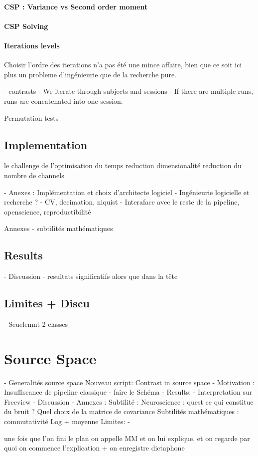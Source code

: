 \paragraph{CSP : Variance vs Second order moment}

\paragraph{CSP Solving}


\paragraph{Iterations levels}

Choisir l'ordre des iterations n'a pas été une mince affaire, bien que ce soit ici plus un probleme d'ingénieurie que de la recherche pure.

- contrasts
    - We iterate through subjects and sessions
        - If there are multiple runs, runs are concatenated into one session.

Permutation tests


\subsection{Implementation}

le challenge de l'optimisation du temps
reduction dimensionalité
reduction du nombre de channels

- Anexes : Implémentation et choix d'architecte logiciel
- Ingénieurie logicielle et recherche ?
- CV, decimation, niquist
- Interaface avec le reste de la pipeline, openscience, reproductibilité

Annexes - subtilités mathématiques

\subsection{Results}
- Discussion
- resultats significatifs alors que dans la tête


\subsection{Limites + Discu}

- Seuelemnt 2 classes

\section{Source Space}

- Generalités source space
Nouveau script: Contrast in source space
- Motivation : Insuffiscance de pipeline classique
- faire le Schéma
- Results:
- Interpretation sur Freeview
- Discussion
- Annexes : Subtilité :
Neuroscience : quest ce qui constitue du bruit ? Quel choix de la matrice de covariance
Subtilités mathématiques :  commutativité Log + moyenne
Limites:
-





une fois que l'on fini le plan on appelle MM et on lui explique, et on regarde par quoi on commence l'explication +  on enregistre dictaphone